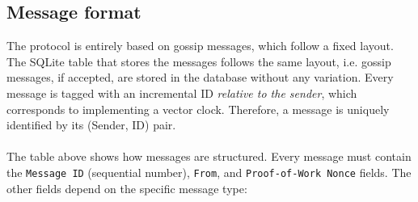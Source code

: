 \documentclass[a4paper,12pt]{article}
\begin{document}
\subsection*{Message format}
The protocol is entirely based on gossip messages, which follow a fixed layout. The SQLite table that stores the messages follows the same layout, i.e. gossip messages, if accepted, are stored in the database without any variation. Every message is tagged with an incremental ID \emph{relative to the sender}, which corresponds to implementing a vector clock. Therefore, a message is uniquely identified by its (Sender, ID) pair.\\
{
	\centering
	\vspace{2mm}
}\\
The table above shows how messages are structured. Every message must contain the \texttt{Message ID} (sequential number), \texttt{From}, and \texttt{Proof-of-Work Nonce} fields. The other fields depend on the specific message type:
\end{document}
